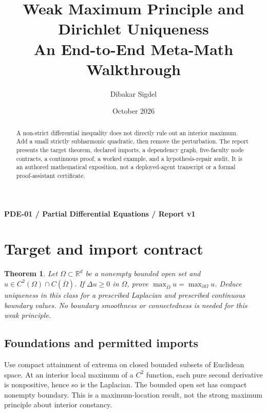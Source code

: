 \documentclass[preprint,12pt,aps,pra,showkeys,amsmath,amssymb,superscriptaddress,floatfix]{revtex4-2}
\newtheorem{theorem}{Theorem}[section]
\theoremstyle{definition}
\theoremstyle{remark}
\begin{document}
\title{Weak Maximum Principle and Dirichlet Uniqueness\\[4pt]\large An End-to-End Meta-Math Walkthrough}

\author{Dibakar Sigdel}


\date{October 2026}

\begin{abstract}

A non-strict differential inequality does not directly rule out an
interior maximum. Add a small strictly subharmonic quadratic, then
remove the perturbation. The report presents the target theorem,
declared imports, a dependency graph, five-faculty node contracts, a
continuous proof, a worked example, and a hypothesis-repair audit. It is
an authored mathematical exposition, not a deployed-agent transcript or
a formal proof-assistant certificate.

\end{abstract}\maketitle\linespread{1.12}\selectfont

\noindent\textbf{PDE-01 / Partial Differential Equations / Report v1}

\section{Target and import contract}

\begin{theorem}

Let \(\Omega\subset\mathbb R^d\) be a nonempty bounded open set and
\(u\in C^2(\Omega)\cap C(\overline\Omega)\). If \(\Delta u\ge0\) in
\(\Omega\), prove \(\max_{\overline\Omega}u=\max_{\partial\Omega}u\).
Deduce uniqueness in this class for a prescribed Laplacian and
prescribed continuous boundary values. No boundary smoothness or
connectedness is needed for this weak principle.

\end{theorem}

\subsection{Foundations and permitted imports}

Use compact attainment of extrema on closed bounded subsets of Euclidean
space. At an interior local maximum of a \(C^2\) function, each pure
second derivative is nonpositive, hence so is the Laplacian. The bounded
open set has compact nonempty boundary. This is a maximum-location
result, not the strong maximum principle about interior constancy.
\end{document}
